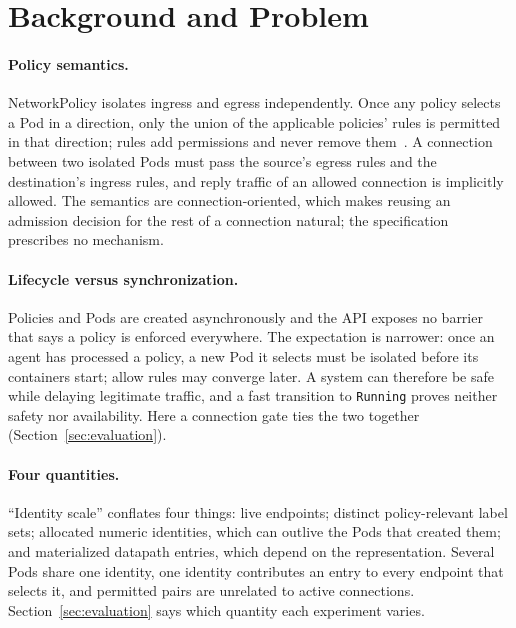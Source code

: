 \section{Background and Problem}
\label{sec:background}
\paragraph{Policy semantics.}
NetworkPolicy isolates ingress and egress independently. Once any policy
selects a Pod in a direction, only the union of the applicable policies'
rules is permitted in that direction; rules add permissions and never
remove them~\cite{k8snetworkpolicy}. A connection between two isolated
Pods must pass the source's egress rules and the destination's ingress
rules, and reply traffic of an allowed connection is implicitly allowed.
The semantics are connection-oriented, which makes reusing an admission
decision for the rest of a connection natural; the specification
prescribes no mechanism.

\paragraph{Lifecycle versus synchronization.}
Policies and Pods are created asynchronously and the API exposes no
barrier that says a policy is enforced everywhere. The expectation is
narrower: once an agent has processed a policy, a new Pod it selects must
be isolated before its containers start; allow rules may converge later.
A system can therefore be safe while delaying legitimate traffic, and a
fast transition to \texttt{Running} proves neither safety nor
availability. Here a connection gate ties the two together
(Section~\ref{sec:evaluation}).

\paragraph{Four quantities.}
``Identity scale'' conflates four things: live endpoints; distinct
policy-relevant label sets; allocated numeric identities, which can
outlive the Pods that created them; and materialized datapath entries,
which depend on the representation. Several Pods share one identity, one
identity contributes an entry to every endpoint that selects it, and
permitted pairs are unrelated to active connections.
Section~\ref{sec:evaluation} says which quantity each experiment varies.

